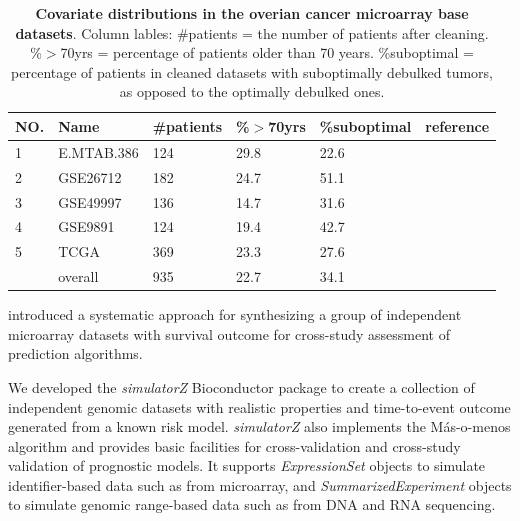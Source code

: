 \documentclass{bioinfo}
\begin{document}
 \begin{table}[!t]
    \begin{tabular*}{1\textwidth}{@{\extracolsep{\fill}}llllll}
      NO. & Name & \#patients & \%$>$70yrs & \%suboptimal & reference\\
      \hline
      1 & E.MTAB.386 & 124 & 29.8 & 22.6  &  \citet{bentink2012angiogenic} \\
       \hline
       2 & GSE26712 & 182 & 24.7 & 51.1 & \citet{bonome2008gene} \\
       \hline
       3 & GSE49997 & 136 & 14.7 & 31.6 & \citet{pils2012validating} \\
       \hline
       4 & GSE9891 & 124 & 19.4 & 42.7  & \citet{tothill2008novel} \\
       \hline
       5 & TCGA & 369 & 23.3 & 27.6 & \citet{cancer2011integrated} \\
       \hline
      \quad & overall & 935 & 22.7 &  34.1 & \\
      \hline
    \end{tabular*}
    \caption{\textbf{Covariate distributions in the overian cancer microarray base datasets}. Column lables:
      \#patients = the number of patients after cleaning. \%$>$70yrs = percentage 
      of patients older than 70 years. \%suboptimal =
      percentage of patients in cleaned datasets with suboptimally debulked tumors, as opposed to the optimally debulked ones.}%
    \label{table-datasets-ovarian}
  \end{table}
  
  \citet{Bernau2014} introduced a systematic approach for synthesizing a
  group of independent microarray datasets with survival outcome for
  cross-study assessment of prediction algorithms. %

  We developed the \emph{simulatorZ} Bioconductor package to
  create a collection of independent genomic datasets with
  realistic properties and time-to-event outcome generated from a
  known risk model. \emph{simulatorZ} also implements the M\'{a}s-o-menos algorithm
  \citep{Zhao2014} and provides basic facilities for 
  cross-validation and cross-study validation of prognostic models.
  It supports \emph{ExpressionSet} objects to simulate
  identifier-based data such as from microarray, and
  \emph{SummarizedExperiment} objects to simulate genomic range-based
  data such as from DNA and RNA sequencing.
\end{document}
